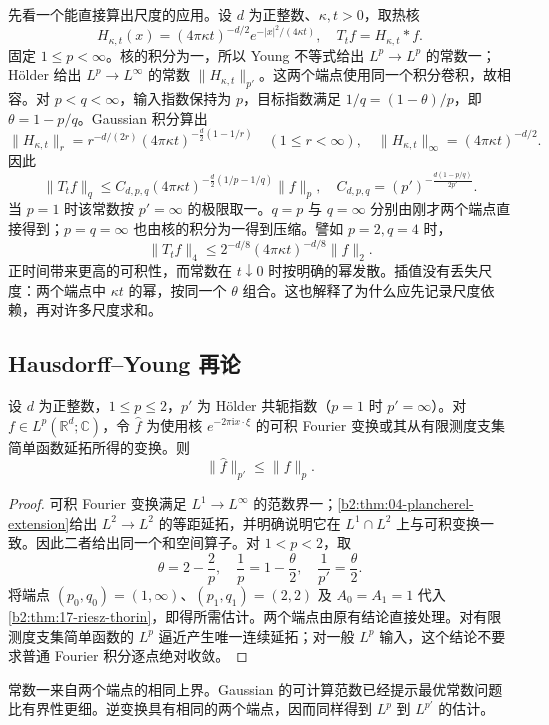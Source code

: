 \ProseParagraphBreak

先看一个能直接算出尺度的应用。设 \(d\) 为正整数、\(\kappa,t>0\)，取热核
\[
 H_{\kappa,t}(x)=(4\pi\kappa t)^{-d/2}
 e^{-|x|^2/(4\kappa t)},
 \quad T_t f=H_{\kappa,t}*f.
\]
固定 \(1\leq p<\infty\)。核的积分为一，所以 Young 不等式给出 \(L^p\rightarrow L^p\) 的常数一；Hölder 给出 \(L^p\rightarrow L^\infty\) 的常数 \(\|H_{\kappa,t}\|_{p'}\)。这两个端点使用同一个积分卷积，故相容。对 \(p<q<\infty\)，输入指数保持为 \(p\)，目标指数满足 \(1/q=(1-\theta)/p\)，即 \(\theta=1-p/q\)。Gaussian 积分算出
\[
 \|H_{\kappa,t}\|_r
 =r^{-d/(2r)}(4\pi\kappa t)^{-\frac d2(1-1/r)}
 \quad(1\leq r<\infty),
 \quad \|H_{\kappa,t}\|_\infty=(4\pi\kappa t)^{-d/2}.
\]
因此
\[
 \|T_t f\|_q
 \leq C_{d,p,q}(4\pi\kappa t)^{-\frac d2(1/p-1/q)}\|f\|_p,
 \quad
 C_{d,p,q}=(p')^{-\frac{d(1-p/q)}{2p'}}.
\]
当 \(p=1\) 时该常数按 \(p'=\infty\) 的极限取一。\(q=p\) 与 \(q=\infty\) 分别由刚才两个端点直接得到；\(p=q=\infty\) 也由核的积分为一得到压缩。譬如 \(p=2,q=4\) 时，
\[
 \|T_t f\|_4\leq 2^{-d/8}(4\pi\kappa t)^{-d/8}\|f\|_2.
\]
正时间带来更高的可积性，而常数在 \(t\downarrow0\) 时按明确的幂发散。插值没有丢失尺度：两个端点中 \(\kappa t\) 的幂，按同一个 \(\theta\) 组合。这也解释了为什么应先记录尺度依赖，再对许多尺度求和。

\subsection{Hausdorff–Young 再论}
\label{b2:subsec:170403}

\begin{corollary}\label{b2:thm:17-hausdorff-young}
设 \(d\) 为正整数，\(1\leq p\leq2\)，\(p'\) 为 Hölder 共轭指数（\(p=1\) 时 \(p'=\infty\)）。对 \(f\in L^p(\mathbb R^d;\mathbb C)\)，令 \(\widehat f\) 为使用核 \(e^{-2\pi\mathrm ix\cdot\xi}\) 的可积 Fourier 变换或其从有限测度支集简单函数延拓所得的变换。则
\[
 \|\widehat f\|_{p'}\leq\|f\|_p.
\]
\end{corollary}
\begin{proof}
可积 Fourier 变换满足 \(L^1\rightarrow L^\infty\) 的范数界一；\cref{b2:thm:04-plancherel-extension}给出 \(L^2\rightarrow L^2\) 的等距延拓，并明确说明它在 \(L^1\cap L^2\) 上与可积变换一致。因此二者给出同一个和空间算子。对 \(1<p<2\)，取
\[
 \theta=2-\frac2p,
 \quad \frac1p=1-\frac\theta2,
 \quad \frac1{p'}=\frac\theta2.
\]
将端点 \((p_0,q_0)=(1,\infty)\)、\((p_1,q_1)=(2,2)\) 及 \(A_0=A_1=1\) 代入\cref{b2:thm:17-riesz-thorin}，即得所需估计。两个端点由原有结论直接处理。对有限测度支集简单函数的 \(L^p\) 逼近产生唯一连续延拓；对一般 \(L^p\) 输入，这个结论不要求普通 Fourier 积分逐点绝对收敛。
\end{proof}
常数一来自两个端点的相同上界。Gaussian 的可计算范数已经提示最优常数问题比有界性更细。逆变换具有相同的两个端点，因而同样得到 \(L^p\) 到 \(L^{p'}\) 的估计。

